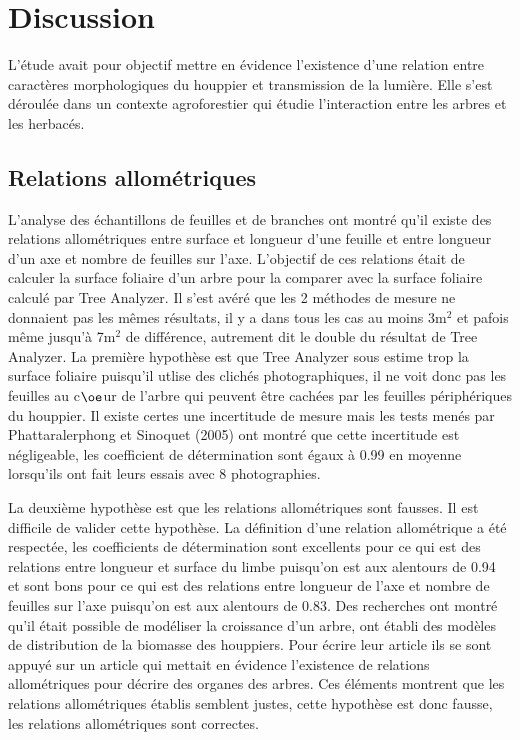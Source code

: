 ﻿\documentclass[12pt]{report}
\begin{document}
\chapter{Discussion}

L'étude avait pour objectif mettre en évidence l'existence d'une relation entre
caractères morphologiques du houppier et transmission de la lumière. Elle s'est
déroulée dans un contexte agroforestier qui étudie l'interaction entre les
arbres et les herbacés.

\section{Relations allométriques}

L'analyse des échantillons de feuilles et de branches ont montré qu'il existe
des relations allométriques entre surface et longueur d'une feuille et entre
longueur d'un axe et nombre de feuilles sur l'axe. L'objectif de ces relations
était de calculer la surface foliaire d'un arbre pour la comparer avec la
surface foliaire calculé par Tree Analyzer. Il s'est avéré que les 2 méthodes de
mesure ne donnaient pas les mêmes résultats, il y a dans tous les cas au moins
3m$^{2}$ et pafois même jusqu'à 7m$^{2}$ de différence, autrement dit le double
du résultat de Tree Analyzer. La première hypothèse est que Tree Analyzer sous
estime trop la surface foliaire puisqu'il utlise des clichés photographiques, il
ne voit donc pas les feuilles au c$\oe$ur de l'arbre qui peuvent être cachées
par les feuilles périphériques du houppier. Il existe certes une incertitude de
mesure mais les tests menés par Phattaralerphong et Sinoquet (2005) ont montré
que cette incertitude est négligeable, les coefficient de détermination sont
égaux à 0.99 en moyenne lorsqu'ils ont fait leurs essais avec 8 photographies.

La deuxième hypothèse est que les relations allométriques sont fausses. Il est
difficile de valider cette hypothèse. La définition d'une relation allométrique
a été respectée, les coefficients de détermination sont excellents pour ce qui
est des relations entre longueur et surface du limbe puisqu'on est aux alentours
de 0.94 et sont bons pour ce qui est des relations entre longueur de l'axe et
nombre de feuilles sur l'axe puisqu'on est aux alentours de 0.83. Des recherches
ont montré qu'il était possible de modéliser la croissance d'un arbre,
\citet{MAR_ref41} ont établi des modèles de distribution de la biomasse des
houppiers. Pour écrire leur article ils se sont appuyé sur un article qui
mettait en évidence l'existence de relations allométriques pour décrire des
organes des arbres. Ces éléments montrent que les relations allométriques
établis semblent justes, cette hypothèse est donc fausse, les relations
allométriques sont correctes.
\end{document}
